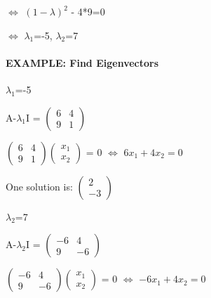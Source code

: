 \documentclass[]{article}
\let\oldparagraph\paragraph
\renewcommand{\paragraph}[1]{\oldparagraph{#1}\mbox{}}
\begin{document}
\(\Longleftrightarrow\) \((1-\lambda)^2\) - 4*9=0\\
 \hspace{3cm}

\(\Longleftrightarrow\) \(\lambda_{1}\)=-5, \(\lambda_{2}\)=7\\
 \newpage

\paragraph{\texorpdfstring{EXAMPLE: Find Eigenvectors\\
}{EXAMPLE: Find Eigenvectors }}\label{example-find-eigenvectors}

\(\lambda_{1}\)=-5

A-\(\lambda_{1}\)I = \(\begin{pmatrix} 6 & 4\\ 9 & 1\end{pmatrix}\)

\hspace{2cm}

\(\begin{pmatrix} 6 & 4\\ 9 & 1\end{pmatrix}\begin{pmatrix} x_{1}\\ x_{2}\end{pmatrix}\)
= 0 \(\Longleftrightarrow\) \(6x_{1} + 4x_{2} = 0\)\\
 \hspace{2cm}

One solution is: \(\begin{pmatrix} 2 \\ -3\end{pmatrix}\)

\(\lambda_{2}\)=7

A-\(\lambda_{2}\)I = \(\begin{pmatrix} -6 & 4\\ 9 & -6\end{pmatrix}\)

\hspace{2cm}

\(\begin{pmatrix} -6 & 4\\ 9 & -6\end{pmatrix}\begin{pmatrix} x_{1}\\ x_{2}\end{pmatrix}\)
= 0 \(\Longleftrightarrow\) \(-6x_{1} + 4x_{2} = 0\)\\
 \hspace{2cm}
\end{document}
